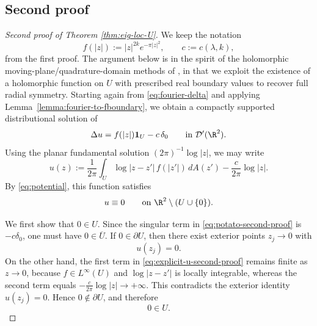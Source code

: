 \subsection{Second proof}

\begin{proof}[Second proof of Theorem \ref{thm:eig-loc-U}]
We keep the notation
\[
f(|z|):=|z|^{2k}e^{-\pi|z|^2},
\qquad
c:=c(\lambda,k),
\]
from the first proof. The argument below is in the spirit of the holomorphic
moving-plane/quadrature-domain methods of \cite{Aharonov-Schiffer-Zalcman,Gustafsson,Karp},
in that we exploit the existence of a holomorphic function on \(U\) with prescribed real
boundary values to recover full radial symmetry. Starting again from \eqref{eq:fourier-delta} and
applying Lemma~\ref{lemma:fourier-to-fboundary}, we obtain a compactly supported distributional
solution of
\begin{equation}\label{eq:potato-second-proof}
\Delta u=f(|z|)\mathbf{1}_U-c\,\delta_0
\qquad\text{in }\mathcal D'(\R^2).
\end{equation}
Using the planar fundamental solution \((2\pi)^{-1}\log|z|\), we may write
\begin{equation}\label{eq:explicit-u-second-proof}
u(z):=\frac{1}{2\pi}\int_U \log|z-z'|\,f(|z'|)\,dA(z')-\frac{c}{2\pi}\log|z|.
\end{equation}
By \eqref{eq:potential}, this function satisfies
\[
u\equiv 0
\qquad\text{on }\R^2\setminus (U\cup\{0\}).
\]

We first show that \(0\in U\). Since the singular term in
\eqref{eq:potato-second-proof} is \(-c\delta_0\), one must have \(0\in\overline U\). If
\(0\in\partial U\), then there exist exterior points \(z_j\to 0\) with
\[
u(z_j)=0.
\]
On the other hand, the first term in \eqref{eq:explicit-u-second-proof} remains finite as
\(z\to 0\), because \(f\in L^\infty(U)\) and \(\log|z-z'|\) is locally integrable, whereas the
second term equals \(-\frac{c}{2\pi}\log|z|\to +\infty\). This contradicts the exterior identity
\(u(z_j)=0\). Hence \(0\notin\partial U\), and therefore
\[
0\in U.
\]


\end{proof}
